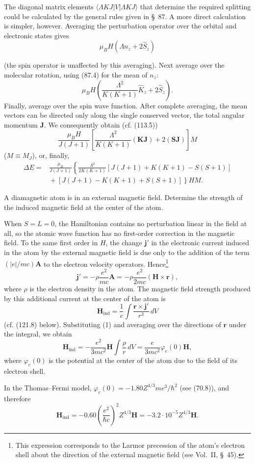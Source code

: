 \SolutionHeading The diagonal matrix elements $\langle\Lambda KJ|V|\Lambda KJ\rangle$ that determine the required splitting could be calculated by the general rules given in §~87. A more direct calculation is simpler, however. Averaging the perturbation operator over the orbital and electronic states gives
\[
 \mu_BH(\Lambda n_z+2\hat S_z)
\]

(the spin operator is unaffected by this averaging). Next average over the molecular rotation, using (87.4) for the mean of $n_z$:
\[
 \mu_BH\left(\frac{\Lambda^2}{K(K+1)}\hat K_z+2\hat S_z\right).
\]
Finally, average over the spin wave function. After complete averaging, the mean vectors can be directed only along the single conserved vector, the total angular momentum $\mathbf J$. We consequently obtain (cf. (113.5))
\[
 \frac{\mu_BH}{J(J+1)}\left[\frac{\Lambda^2}{K(K+1)}(\mathbf K\mathbf J)+2(\mathbf S\mathbf J)\right]M
\]
($M\equiv M_J$), or, finally,
\[
 \begin{split}
 \Delta E={}&\frac{\mu_B}{J(J+1)}\left\{\frac{\Lambda^2}{2K(K+1)}
 [J(J+1)+K(K+1)-S(S+1)]\right.\\
 &\left.{}+[J(J+1)-K(K+1)+S(S+1)]\right\}HM.
 \end{split}
\]

 A diamagnetic atom is in an external magnetic field. Determine the strength of the induced magnetic field at the center of the atom.

\SolutionHeading When $S=L=0$, the Hamiltonian contains no perturbation linear in the field at all, so the atomic wave function has no first-order correction in the magnetic field. To the same first order in $H$, the change $\mathbf j'$ in the electronic current induced in the atom by the external magnetic field is due only to the addition of the term $(|e|/mc)\mathbf A$ to the electron velocity operators. Hence\footnote{This expression corresponds to the Larmor precession of the atom's electron shell about the direction of the external magnetic field (see Vol.~II, §~45).}
\begin{equation}
 \mathbf j'=-\rho\frac{e^2}{mc}\mathbf A=-\rho\frac{e^2}{2mc}(\mathbf H\times\mathbf r),
 \tag{1}
\end{equation}
where $\rho$ is the electron density in the atom. The magnetic field strength produced by this additional current at the center of the atom is
\[
 \mathbf H_{\text{ind}}=\frac1c\int\frac{\mathbf r\times\mathbf j'}{r^3}\,dV
\]
(cf. (121.8) below). Substituting (1) and averaging over the directions of $\mathbf r$ under the integral, we obtain
\begin{equation}
 \mathbf H_{\text{ind}}=-\frac{e^2}{3mc^2}\mathbf H\int\frac\rho r\,dV=\frac{e}{3mc^2}\varphi_e(0)\mathbf H,
 \tag{2}
\end{equation}
where $\varphi_e(0)$ is the potential at the center of the atom due to the field of its electron shell.

In the Thomas--Fermi model, $\varphi_e(0)=-1.80Z^{4/3}me^3/\hbar^2$ (see (70.8)), and therefore
\[
 \mathbf H_{\text{ind}}=-0.60\left(\frac{e^2}{\hbar c}\right)^2Z^{4/3}\mathbf H=-3.2\cdot10^{-5}Z^{4/3}\mathbf H.
\]

